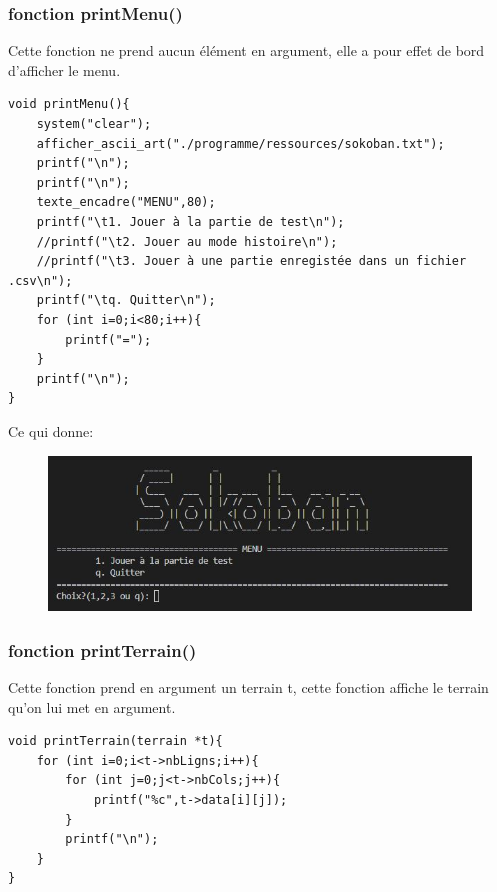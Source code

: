 \documentclass[10pt,a4paper,french,titlepage]{article}
\begin{document}
\subsubsection{fonction printMenu()}
Cette fonction ne prend aucun élément en argument, elle a pour effet de bord d'afficher le menu.
\begin{lstlisting}
void printMenu(){
    system("clear");
    afficher_ascii_art("./programme/ressources/sokoban.txt");
    printf("\n");
    printf("\n");
    texte_encadre("MENU",80);
    printf("\t1. Jouer à la partie de test\n");
    //printf("\t2. Jouer au mode histoire\n");
    //printf("\t3. Jouer à une partie enregistée dans un fichier .csv\n");
    printf("\tq. Quitter\n");
    for (int i=0;i<80;i++){
        printf("=");
    }
    printf("\n");
}
\end{lstlisting}
Ce qui donne:
\begin{figure}[h]
\centering
\includegraphics[scale=0.6]{img/menu.JPG}
\end{figure}
\subsubsection{fonction printTerrain()}
Cette fonction prend en argument un terrain t, cette fonction affiche le terrain qu’on lui met en argument. 
\begin{lstlisting}
void printTerrain(terrain *t){
    for (int i=0;i<t->nbLigns;i++){
        for (int j=0;j<t->nbCols;j++){
            printf("%c",t->data[i][j]);
        }
        printf("\n");
    }
}
\end{lstlisting}
\end{document}
